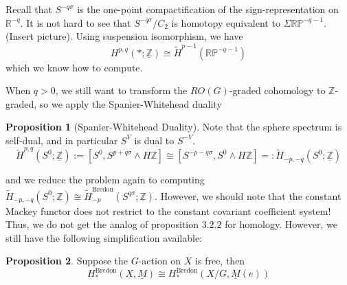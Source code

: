 \documentclass{article}
\theoremstyle{definition}
\theoremstyle{definition}
\theoremstyle{definition}
\theoremstyle{definition}
\newtheorem{proposition}{Proposition}[theorem]
\theoremstyle{definition}
\theoremstyle{definition}
\theoremstyle{definition}
\begin{document}
Recall that $S^{-q\sigma}$ is the one-point compactification of the sign-representation on $\mathbb{R}^{-q}$. It is not hard to see that $S^{-q\sigma}/C_2$ is homotopy equivalent to $\Sigma \mathbb{RP}^{-q-1}$. (Insert picture). Using suspension isomorphism, we have 
\[H^{p,q}(*;\underline{\mathbb{Z}})\cong \tilde{H}^{p-1}(\mathbb{RP}^{-q-1})\]
which we know how to compute. 

When $q>0$, we still want to transform the $RO(G)$-graded cohomology to $\mathbb{Z}$-graded, so we apply the Spanier-Whitehead duality 


\begin{tcolorbox}[colback=blue!5!white,colframe=blue!30!white]
\begin{proposition}[Spanier-Whitehead Duality]
Note that the sphere spectrum is self-dual, and in particular $S^{V}$ is dual to $S^{-V}$. 
    \[\tilde{H}^{p,q}(S^0;\underline{\mathbb{Z}}):=[S^0,S^{p+q\sigma}\wedge H \mathbb{Z}]\cong [S^{-p-q\sigma}, S^0\wedge H \mathbb{Z}]=: \tilde{H}_{-p,-q}(S^0;\underline{\mathbb{Z}})\]
\end{proposition}
\end{tcolorbox}
and we reduce the problem again to computing $\tilde{H}_{-p,-q}(S^0;\underline{\mathbb{Z}})\cong \tilde{H}^{\textrm{Bredon}}_{-p}(S^{q\sigma};\underline{\mathbb{Z}})$. However, we should note that the constant Mackey functor does not restrict to the constant covariant coefficient system! Thus, we do not get the analog of proposition $3.2.2$ for homology. However, we still have the following simplification available: 


\begin{tcolorbox}[colback=blue!5!white,colframe=blue!30!white]
\begin{proposition}
Suppose the $G$-action on $X$ is free, then 
\[H^{\textrm{Bredon}}_{*}(X, \underline{M})\cong H^{\textrm{Bredon}}_{*}(X/G, \underline{M}(e))\]
\end{proposition}
\end{tcolorbox}
 
\end{document}
